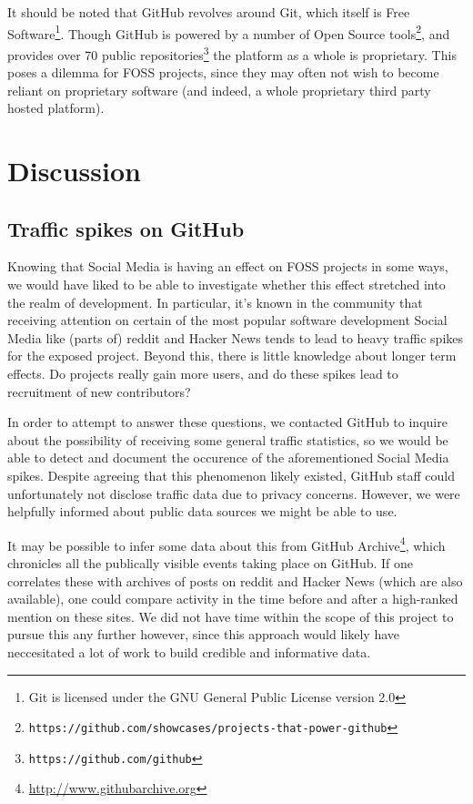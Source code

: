 \documentclass[a4paper,11pt]{article} %
\begin{document}
It should be noted that GitHub revolves around Git, which itself is
Free Software\footnote{Git is licensed under the GNU General Public
  License version 2.0}. Though GitHub is powered by a number of Open
Source
tools\footnote{\texttt{https://github.com/showcases/projects-that-power-github}},
and provides over \num{70} public
repositories\footnote{\texttt{https://github.com/github}} the platform
as a whole is proprietary. This poses a dilemma for FOSS projects,
since they may often not wish to become reliant on proprietary
software (and indeed, a whole proprietary third party hosted
platform).


\section{Discussion}

\subsection{Traffic spikes on GitHub}

Knowing that Social Media is having an effect on FOSS projects in some ways,
we would have liked to be able to investigate whether this effect stretched
into the realm of development. In particular, it's known in the community
that receiving attention on certain of the most popular software development
Social Media like (parts of) reddit and Hacker News tends to lead to heavy
traffic spikes for the exposed project. Beyond this, there is little
knowledge about longer term effects. Do projects really gain more users, and
do these spikes lead to recruitment of new contributors?

In order to attempt to answer these questions, we contacted GitHub to
inquire about the possibility of receiving some general traffic
statistics, so we would be able to detect and document the occurence
of the aforementioned Social Media spikes. Despite agreeing that this
phenomenon likely existed, GitHub staff could unfortunately not
disclose traffic data due to privacy concerns. However, we were
helpfully informed about public data sources we might be able to use.

It may be possible to infer some data about this from GitHub
Archive\footnote{\url{http://www.githubarchive.org}}, which chronicles
all the publically visible events taking place on GitHub. If one
correlates these with archives of posts on reddit and Hacker News
(which are also available), one could compare activity in the time
before and after a high-ranked mention on these sites. We did not have
time within the scope of this project to pursue this any further
however, since this approach would likely have neccesitated a lot of
work to build credible and informative data.
\end{document}
